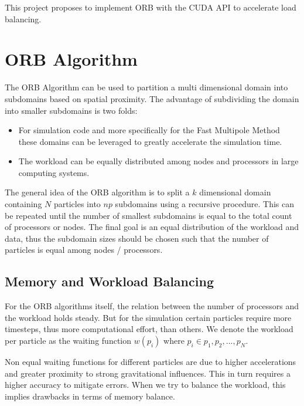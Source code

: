 \documentclass[]{article}
\begin{document}
This project proposes to implement ORB with the CUDA API to accelerate load balancing.

\section{ORB Algorithm}


The ORB Algorithm can be used to partition a multi dimensional domain into subdomains based on spatial proximity. The advantage of subdividing the domain into smaller subdomains is two folds:

\begin{itemize}
	\item For simulation code and more specifically for the Fast Multipole Method these domains can be leveraged to greatly accelerate the simulation time. 
	\item The workload can be equally distributed among nodes and processors in large computing systems.
\end{itemize} 


The general idea of the ORB algorithm is to split a $k$ dimensional domain containing $N$ particles into $np$ subdomains using a recursive procedure. This can be repeated until the number of smallest subdomains is equal to the total count of processors or nodes. The final goal is an equal distribution of the workload and data, thus the subdomain sizes should be chosen such that the number of particles is equal among nodes / processors.

\subsection{Memory and Workload Balancing}
For the ORB algorithms itself, the relation between the number of processors and the workload holds steady. But for the simulation certain particles require more timesteps, thus more computational effort, than others. We denote the workload per particle as the waiting function $w(p_i)$ where $p_i \in {p_1, p_2, ..., p_N}$.

Non equal waiting functions for different particles are due to higher accelerations and greater proximity to strong gravitational influences. This in turn requires a higher accuracy to mitigate errors. When we try to balance the workload, this implies drawbacks in terms of memory balance. 
\end{document}
